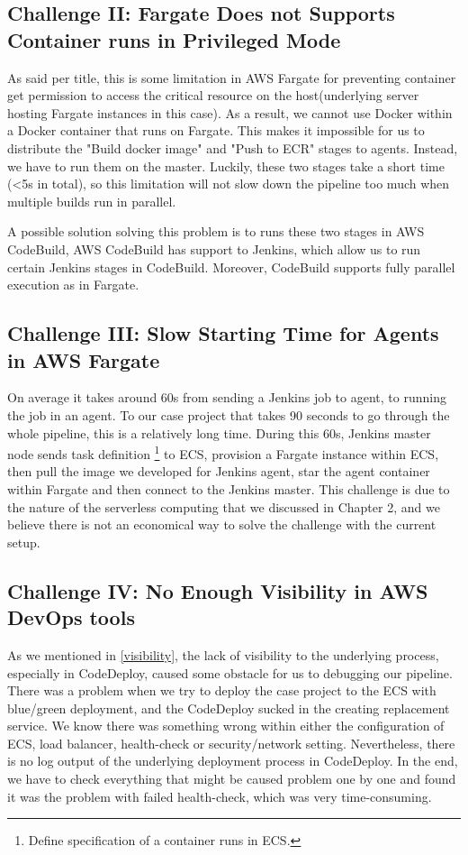 \subsection{Challenge II: Fargate Does not Supports Container runs in Privileged Mode}
As said per title, this is some limitation in AWS Fargate for preventing container get permission to access the critical resource on the host(underlying server hosting Fargate instances in this case). As a result, we cannot use Docker within a Docker container that runs on Fargate. This makes it impossible for us to distribute the "Build docker image" and "Push to ECR" stages to agents. Instead, we have to run them on the master. Luckily, these two stages take a short time (<5s in total), so this limitation will not slow down the pipeline too much when multiple builds run in parallel.
\par
A possible solution solving this problem is to runs these two stages in AWS CodeBuild, AWS CodeBuild has support to Jenkins, which allow us to run certain Jenkins stages in CodeBuild. Moreover, CodeBuild supports fully parallel execution as in Fargate.
\subsection{Challenge III: Slow Starting Time for Agents in AWS Fargate}
On average it takes around 60s from sending a Jenkins job to agent, to running the job in an agent. To our case project that takes 90 seconds to go through the whole pipeline, this is a relatively long time. During this 60s, Jenkins master node sends task definition \footnote{Define specification of a container runs in ECS.} to ECS, provision a Fargate instance within ECS, then pull the image we developed for Jenkins agent, star the agent container within Fargate and then connect to the Jenkins master. This challenge is due to the nature of the serverless computing that we discussed in Chapter 2, and we believe there is not an economical way to solve the challenge with the current setup.
\subsection{Challenge IV: No Enough Visibility in AWS DevOps tools}
As we mentioned in \ref{visibility}, the lack of visibility to the underlying process, especially in CodeDeploy, caused some obstacle for us to debugging our pipeline. There was a problem when we try to deploy the case project to the ECS with blue/green deployment, and the CodeDeploy sucked in the creating replacement service. We know there was something wrong within either the configuration of ECS, load balancer, health-check or security/network setting. Nevertheless, there is no log output of the underlying deployment process in CodeDeploy. In the end, we have to check everything that might be caused problem one by one and found it was the problem with failed health-check, which was very time-consuming.